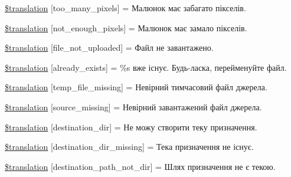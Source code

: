 \begin{DoxyCompactItemize}
\item 
\hyperlink{class_8upload_8uk___u_a_8php_aa4051ef64e94a3f8295c63cf85544016}{\$translation} \mbox{[}\textquotesingle{}too\+\_\+many\+\_\+pixels\textquotesingle{}\mbox{]} = \textquotesingle{}Малюнок має забагато пікселів.\textquotesingle{}
\item 
\hyperlink{class_8upload_8uk___u_a_8php_a1fe342c27ce61f4ff4e0120ba647033e}{\$translation} \mbox{[}\textquotesingle{}not\+\_\+enough\+\_\+pixels\textquotesingle{}\mbox{]} = \textquotesingle{}Малюнок має замало пікселів.\textquotesingle{}
\item 
\hyperlink{class_8upload_8uk___u_a_8php_a4ce76e7be0b3a03c2b47f6d70c21832e}{\$translation} \mbox{[}\textquotesingle{}file\+\_\+not\+\_\+uploaded\textquotesingle{}\mbox{]} = \textquotesingle{}Файл не завантажено.\textquotesingle{}
\item 
\hyperlink{class_8upload_8uk___u_a_8php_afd84e910217f04139f567c41e292afa5}{\$translation} \mbox{[}\textquotesingle{}already\+\_\+exists\textquotesingle{}\mbox{]} = \textquotesingle{}\%s вже існує. Будь-\/ласка, перейменуйте файл.\textquotesingle{}
\item 
\hyperlink{class_8upload_8uk___u_a_8php_ab0fa87a88aba2624004581eed0633325}{\$translation} \mbox{[}\textquotesingle{}temp\+\_\+file\+\_\+missing\textquotesingle{}\mbox{]} = \textquotesingle{}Невірний тимчасовий файл джерела.\textquotesingle{}
\item 
\hyperlink{class_8upload_8uk___u_a_8php_aceaaf7355acaaf10f0ae60378d03c468}{\$translation} \mbox{[}\textquotesingle{}source\+\_\+missing\textquotesingle{}\mbox{]} = \textquotesingle{}Невірний завантажений файл джерела.\textquotesingle{}
\item 
\hyperlink{class_8upload_8uk___u_a_8php_aff2427c72a2598aefa6d58df1dd18b08}{\$translation} \mbox{[}\textquotesingle{}destination\+\_\+dir\textquotesingle{}\mbox{]} = \textquotesingle{}Не можу створити теку призначення.\textquotesingle{}
\item 
\hyperlink{class_8upload_8uk___u_a_8php_a9ef28d3cf09942c6c0a1e77fa09185e8}{\$translation} \mbox{[}\textquotesingle{}destination\+\_\+dir\+\_\+missing\textquotesingle{}\mbox{]} = \textquotesingle{}Тека призначення не існує.\textquotesingle{}
\item 
\hyperlink{class_8upload_8uk___u_a_8php_a5704a67137126e8c87b7a364175929d4}{\$translation} \mbox{[}\textquotesingle{}destination\+\_\+path\+\_\+not\+\_\+dir\textquotesingle{}\mbox{]} = \textquotesingle{}Шлях призначення не є текою.\textquotesingle{}
\item 

\end{DoxyCompactItemize}
